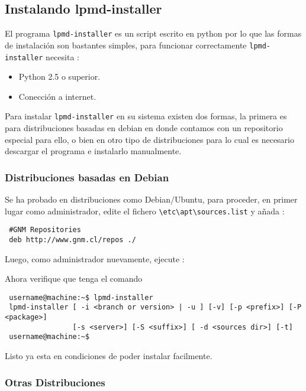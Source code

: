 \subsection{Instalando lpmd-installer}

El programa \verb|lpmd-installer| es un script escrito en python por lo que las formas de instalaci\'on son bastantes simples, para funcionar correctamente \verb|lpmd-installer| necesita :

\begin{itemize}
\item Python 2.5 o superior.
\item Conecci\'on a internet.
\end{itemize}

Para instalar \verb|lpmd-installer| en su sistema existen dos formas, la primera es para distribuciones basadas en debian en donde contamos con un repositorio especial para ello, o bien en otro tipo de distribuciones para lo cual es necesario descargar el programa e instalarlo manualmente.

\subsubsection{Distribuciones basadas en Debian}

Se ha probado en distribuciones como Debian/Ubuntu, para proceder, en primer lugar como administrador, edite el fichero \verb|\etc\apt\sources.list| y a\~nada :

\begin{verbatim}
 #GNM Repositories
 deb http://www.gnm.cl/repos ./
\end{verbatim}

Luego, como administrador nuevamente, ejecute :

Ahora verifique que tenga el comando
\begin{verbatim}
 username@machine:~$ lpmd-installer 
 lpmd-installer [ -i <branch or version> | -u ] [-v] [-p <prefix>] [-P <package>] 
                [-s <server>] [-S <suffix>] [ -d <sources dir>] [-t]
 username@machine:~$
\end{verbatim}

Listo ya esta en condiciones de poder instalar {\lpmd} facilmente.

\subsubsection{Otras Distribuciones}

